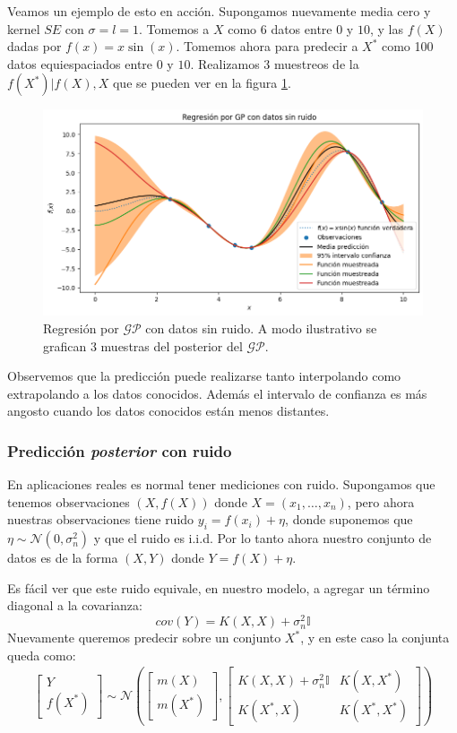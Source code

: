 \documentclass[a4paper]{article}
\newcommand{\gp}{\ensuremath{\mathcal{GP}}}
\begin{document}
Veamos un ejemplo de esto en acción. Supongamos nuevamente media cero y kernel $SE$ con $\sigma=l=1$. Tomemos a $X$ como 6 datos entre 0 y $10$, y las $f(X)$ dadas por $f(x)=x\sin(x)$. Tomemos ahora para predecir a $X^*$ como 100 datos equiespaciados entre $0$ y $10$. Realizamos 3 muestreos de la $f(X^*) | f(X), X$ que se pueden ver en la figura \ref{fig:gpostsinruido}.
\begin{figure}[H]
	\centering
	\includegraphics[trim={0cm 0cm 0cm 0cm},clip,width=\textwidth]{gppostsinruido.png}
	\caption{Regresión por $\gp$ con datos sin ruido. A modo ilustrativo se grafican 3 muestras del posterior del $\gp$.}
	\label{fig:gpostsinruido}
\end{figure}

Observemos que la predicción puede realizarse tanto interpolando como extrapolando a los datos conocidos. Además el intervalo de confianza es más angosto cuando los datos conocidos están menos distantes.



\subsubsection{Predicción \emph{posterior} con ruido}
En aplicaciones reales es normal tener mediciones con ruido. Supongamos que tenemos observaciones $(X,f(X))$ donde $X=\left(x_1,\dots,x_n\right)$, pero ahora nuestras observaciones tiene ruido $y_i = f(x_i) + \eta$, donde suponemos que $\eta \sim \mathcal{N}(0, \sigma^2_n)$ y que el ruido es i.i.d. Por lo tanto ahora nuestro conjunto de datos es de la forma $(X,Y)$ donde $Y=f(X) + \eta$. 

Es fácil ver que este ruido equivale, en nuestro modelo, a agregar un término diagonal a la covarianza:
$$ cov(Y) = K(X,X) + \sigma^2_n\mathbb{I} $$
Nuevamente queremos predecir sobre un conjunto $X^*$, y en este caso la conjunta queda como:
\begin{align}
	\begin{bmatrix} Y \\ f(X^*)  \end{bmatrix}
	\sim \mathcal{N} \left(
	\begin{bmatrix} m(X) \\ m(X^*)  \end{bmatrix}, 
	\begin{bmatrix}
		K(X,X) + \sigma_n^2\mathbb{I} & K(X, X^*) \\ K(X^*,X) & K(X^*,X^*)
	\end{bmatrix}
	\right)
\end{align}
\end{document}
